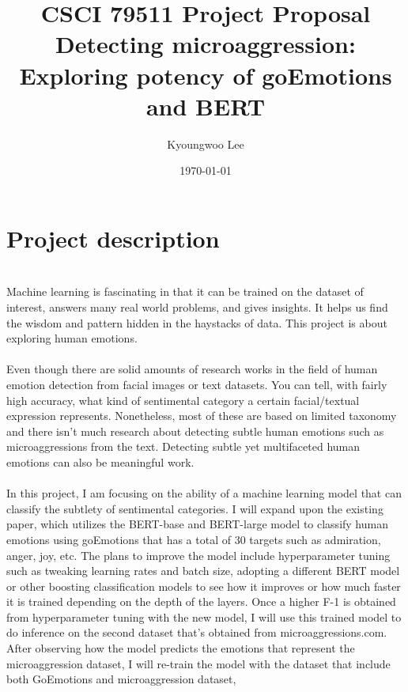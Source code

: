 \documentclass[12pt]{main}
\title{
	CSCI 79511 Project Proposal\\ \vspace{3mm} 
	\large Detecting microaggression:
	\\ Exploring potency of goEmotions\cite{goEmotions} and BERT\cite{bert}
}
\author{Kyoungwoo Lee}
\date{\today}
\begin{document}
\maketitle




\section*{Project description}
\\
Machine learning is fascinating in that it can be trained on the dataset of interest,
answers many real world problems, and gives insights.
It helps us find the wisdom and pattern hidden in the haystacks of data.
This project is about exploring human emotions.
\vspace{-2mm}\\
\\
Even though there are solid amounts of research works in the field of human emotion detection
from facial images\cite{Facial} or text\cite{AffectiveComputing} datasets.
You can tell, with fairly high accuracy, what kind of sentimental category a certain facial/textual expression represents.
Nonetheless,  most of these are based on limited taxonomy\cite{basicemotions} and there isn’t much research
about detecting subtle human emotions such as microaggressions from the text.
Detecting subtle yet multifaceted human emotions can also be meaningful work.
\vspace{-2mm}\\
\\
In this project, I am focusing on the ability of a machine learning model that can classify
the subtlety of sentimental categories. I will expand upon the existing paper,
which utilizes the BERT-base and BERT-large model to classify human emotions using goEmotions
that has a total of 30 targets such as admiration, anger, joy, etc.
The plans to improve the model include hyperparameter tuning such as tweaking learning rates and batch size,
adopting a different BERT model or other boosting classification models
to see how it improves or how much faster it is trained depending on the depth of the layers.
Once a higher F-1 is obtained from hyperparameter tuning with the new model,
I will use this trained model to do inference on the second dataset that’s obtained from microaggressions.com.
After observing how the model predicts the emotions that represent the microaggression dataset,
I will re-train the model with the dataset that include both GoEmotions and microaggression dataset,
\end{document}
